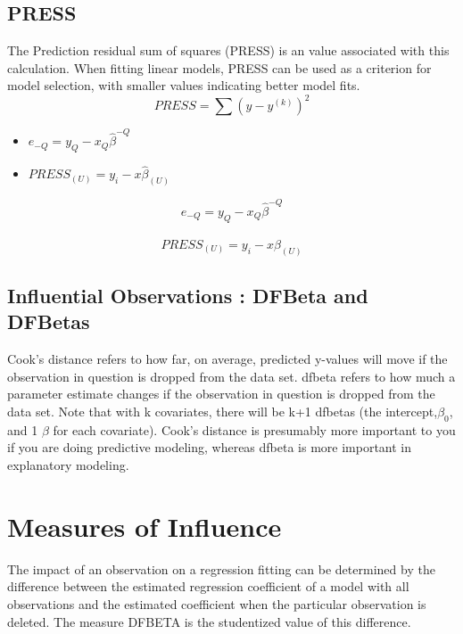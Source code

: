 \documentclass[12pt, a4paper]{report}
\begin{document}
\subsection{PRESS} %
The Prediction residual sum of squares (PRESS) is an value associated with this calculation. When fitting linear models, PRESS can be used as a criterion for model selection, with smaller values indicating better model fits.
\begin{equation}
PRESS = \sum(y-y^{(k)})^2
\end{equation}
\begin{itemize}
	\item $e_{-Q} = y_{Q} - x_{Q}\hat{\beta}^{-Q}$
	\item $PRESS_{(U)} = y_{i} - x\hat{\beta}_{(U)}$
\end{itemize}


\begin{equation}
e_{-Q} = y_{Q} - x_{Q}\hat{\beta}^{-Q}
\end{equation}

\begin{equation}
PRESS_{(U)} = y_{i} - x\hat{\beta}_{(U)}
\end{equation}





\subsection{Influential Observations : DFBeta and DFBetas}
Cook's distance refers to how far, on average, predicted y-values will move if the observation in question is dropped from the data set. dfbeta refers to how much a parameter estimate changes if the observation in question is dropped from the data set. Note that with k covariates, there will be k+1 dfbetas (the intercept,$\beta_0$, and 1 $\beta$ for each covariate). Cook's distance is presumably more important to you if you are doing predictive modeling, whereas dfbeta is more important in explanatory modeling.

\section{Measures of Influence} %

The impact of an observation on a regression fitting can be determined by the difference between the estimated regression coefficient of a model with all observations and the estimated coefficient when the particular observation is deleted. The measure DFBETA is the studentized value of this difference.
\end{document}
